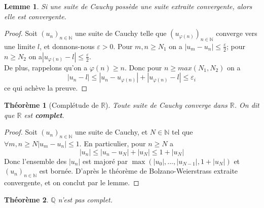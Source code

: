 \documentclass[french]{book}
\newcommand{\R}{\mathbb{R}}
\theoremstyle{plain}
\newtheorem{thm}{Théorème}[chapter]
\newtheorem{lem}{Lemme}[chapter]
\theoremstyle{definition}
\theoremstyle{remark}
\begin{document}
\begin{lem}
	Si une suite de Cauchy possède une suite extraite convergente, alors elle est convergente.
\end{lem}
\begin{proof}
	Soit $(u_{n})_{n\in \mathbb{N}}$ une suite de Cauchy telle que $(u_{\varphi(n)})_{n\in\mathbb{N}}$ converge vers une limite $l$, et donnons-nous $\varepsilon>0$. Pour $m,n\ge N_{1}$ on a $|u_{m}-u_{n}|\le\frac{\varepsilon}{2}$; pour $n\ge N_{2}$ on a$\displaystyle|u_{\varphi(n)}-l|\le\frac{\varepsilon}{2}$. \\
De plus, rappelons qu'on a $\varphi(n)\ge n$. Donc pour $n\ge max(N_{1},N_{2})$ on a
$$|u_{n}-l|\le|u_{n}-u_{\varphi(n)}|+|u_{\varphi(n)}-l|\le\varepsilon_{i}$$
ce qui achève la preuve.
\end{proof}
\begin{thm}[Complétude de $\R$]
	Toute suite de Cauchy converge dans $\mathbb{R}$. On dit que $\mathbb{R}$ est \textbf{complet}.
\end{thm}
\begin{proof}
	Soit $(u_{n})_{n\in\mathbb{N}}$ une suite de Cauchy, et $N\in\mathbb{N}$ tel que $\forall m, n\ge N |u_{m}-u_{n}|\le1$. En particulier, pour $n\ge N$ a $$|u_{n}|\le|u_{n}-u_{N}|+|u_{N}|\le1+|u_{N}|$$ Donc l'ensemble des $\lvert u_n\rvert $ est majoré par $\max(|u_{0}|,...,|u_{N-1}|,1+|u_{N}|)$ et $(u_{n})_{n\in\mathbb{N}}$ est bornée.
D'après le théorème de Bolzano-Weierstrass extraite convergente, et on conclut par le lemme.
\end{proof}
\begin{thm}
	$\mathbb{Q}$ n'est pas complet.
\end{thm}
\end{document}
